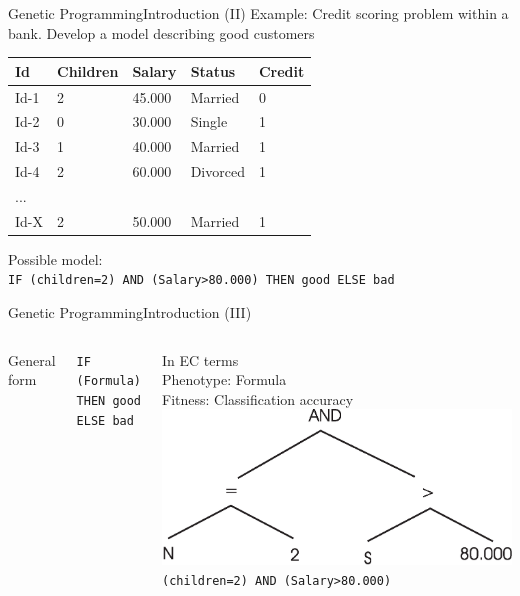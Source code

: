 \documentclass[10pt,compress]{beamer} %
\begin{document}
\begin{frame}{Genetic Programming}{Introduction (II)}
	Example: Credit scoring problem within a bank.  Develop a model describing good customers

	\begin{table}[]
	\centering
		\begin{tabular}{|l|l|l|l|l|}
		\hline
		Id 	 & Children & Salary & Status & Credit \\ \hline
 		Id-1 & 2 	& 45.000 & Married & 0 \\ \hline
  		Id-2 & 0 	& 30.000 & Single & 1 \\ \hline
   		Id-3 & 1 	& 40.000 & Married & 1 \\ \hline
   		Id-4 & 2 	& 60.000 & Divorced & 1 \\ \hline
   		 ... &  	&  &  &  \\ \hline
   		Id-X & 2 	& 50.000 & Married & 1  \\ \hline
		\end{tabular}
	\end{table}

	   Possible model:\\
	   \texttt{IF (children=2) AND (Salary>80.000) THEN good ELSE bad}
\end{frame}

\begin{frame}{Genetic Programming}{Introduction (III)}
    \begin{columns}
	  	General form\\
			\begin{center}
	   		\texttt{IF (Formula) \\THEN good \\ELSE bad}\\
	  		\end{center} 
	   In EC terms\\
	   Phenotype: Formula\\
	   Fitness: Classification accuracy
		\includegraphics[width=\linewidth]{figs/parsetree.eps}\\\bigskip
	   \centering\small{\texttt{(children=2) AND (Salary>80.000)}}
	\end{columns}
\end{frame}
\end{document}
